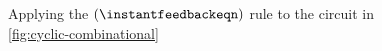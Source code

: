 \begin{figure}
    \centering
    \caption{
        Applying the \((\instantfeedbackeqn)\) rule to the circuit in
        \cref{fig:cyclic-combinational}
    }
    \label{fig:cyclic-combinational-unrolled}
\end{figure}